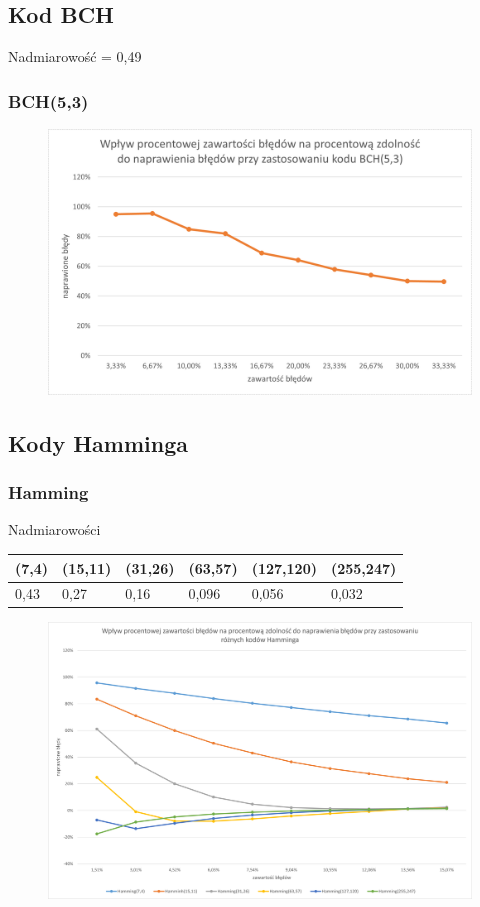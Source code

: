 \documentclass{beamer}
\begin{document}
\subsection{Kod BCH}
\begin{frame}

Nadmiarowość = 0,49

\frametitle{BCH(5,3)}
\begin{figure}
    \centering
    \includegraphics[scale=0.5]{wykresy/bch.png}
\end{figure}

\end{frame}

\subsection{Kody Hamminga}

\begin{frame}
\frametitle{Hamming}
\tiny
\centering
Nadmiarowości
\begin{table}[]
    \begin{tabular}{|l|l|l|l|l|l|}
    \hline
    (7,4) & (15,11) & (31,26) & (63,57) & (127,120) & (255,247) \\ \hline
    0,43  & 0,27    & 0,16    & 0,096   & 0,056     & 0,032     \\ \hline
    \end{tabular}
\end{table}
\begin{figure}
    \centering
    \includegraphics[scale=0.3]{wykresy/hamming.png}
\end{figure}
\end{frame}
\end{document}

